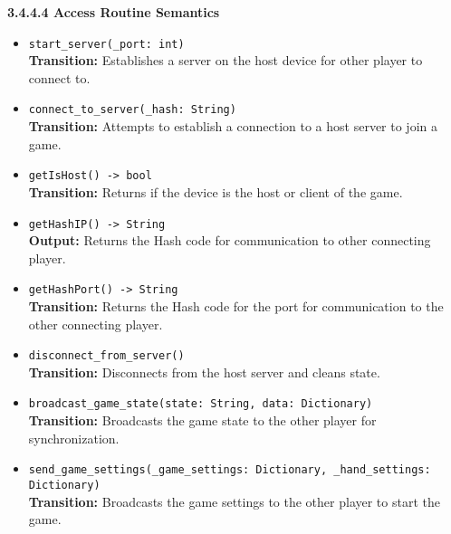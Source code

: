 \documentclass[12pt, titlepage]{article}
\begin{document}
\textbf{3.4.4.4 Access Routine Semantics}
\begin{itemize}
    \item \texttt{start\_server(\_port: int)}\\
    \textbf{Transition:} Establishes a server on the host device for other player to connect to.

    \item \texttt{connect\_to\_server(\_hash: String)}\\
    \textbf{Transition:} Attempts to establish a connection to a host server to join a game.

    \item \texttt{getIsHost() -> bool}\\
    \textbf{Transition:} Returns if the device is the host or client of the game.

    \item \texttt{getHashIP() -> String}\\
    \textbf{Output:} Returns the Hash code for communication to other connecting player.

    \item \texttt{getHashPort() -> String}\\
    \textbf{Transition:} Returns the Hash code for the port for communication to the other connecting player.
    
    \item \texttt{disconnect\_from\_server()}\\
    \textbf{Transition:} Disconnects from the host server and cleans state.
    
    \item \texttt{broadcast\_game\_state(state: String, data: Dictionary)}\\
    \textbf{Transition:} Broadcasts the game state to the other player for synchronization.
    
    \item \texttt{send\_game\_settings(\_game\_settings: Dictionary, \_hand\_settings: Dictionary)}\\
    \textbf{Transition:} Broadcasts the game settings to the other player to start the game.
\end{itemize}
\end{document}
